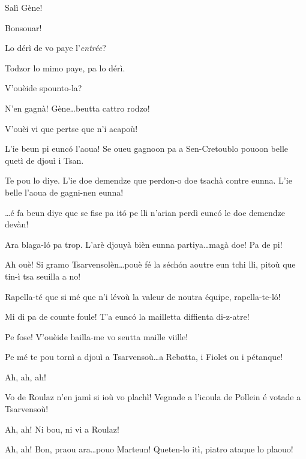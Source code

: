\begin{drama}
\Djouiyaoueunspeaks Salì Gène!

\Genespeaks Bonsouar!

\Dorinaspeaks{} Lo dérì de vo paye l'\textit{entrée}?

\Djouiyaoudouspeaks Todzor lo mimo paye, pa lo dérì.


\Genespeaks{} V'ouèide spounto-la?

\Djouiyaoueunspeaks N'en gagnà! Gène\ldots beutta cattro rodzo!

\Djouiyaoueunspeaks{} V'ouèi vi que pertse que n’i acapoù!

\Djouiyaoudouspeaks L'ie beun pi eunc\'o l'aoua! Se oueu gagnoon pa a Sen-Cretoublo pouoon belle quetì de djouì i Tsan.


\Selmospeaks	Te pou lo diye. L'ie doe demendze que perdon-o doe tsachà contre eunna. L'ie belle l'aoua de gagni-nen eunna!

\Djouiyaoueunspeaks{} \ldots é fa beun diye que se fise pa it\'o pe lli n'arian perdì eunc\'o le doe demendze devàn!

\Djouiyaoudouspeaks Ara blaga-l\'o pa trop. L’arè djouyà bièn eunna partiya\ldots magà doe! Pa de pi!

\Selmospeaks Ah ouè! Si gramo Tsarvensolèn\ldots pouè fé la séch\'on aoutre eun tchi lli, pitoù que tin-ì tsa seuilla a no!

\Marteunspeaks  Rapella-té que si mé que n’i lévoù la valeur de noutra équipe, rapella-te-l\'o!

\Selmospeaks Mi di pa de counte foule! T'a eunc\'o la mailletta diffienta di-z-atre!

\Marteunspeaks Pe fose! V'ouèide bailla-me vo seutta maille viille!

\Djouiyaoudouspeaks{} Pe mé te pou tornì a djouì a Tsarvensoù\ldots a Rebatta, i Fiolet ou i pétanque!

\Selmospeaks Ah, ah, ah!

\Djouiyaoueunspeaks Vo de Roulaz n'en jamì si ioù vo plachì! Vegnade a l'icoula de Pollein é votade a Tsarvensoù!

\Djouiyaoudouspeaks Ah, ah! Ni bou, ni vi a Roulaz!

\Selmospeaks Ah, ah! Bon, praou ara\ldots pouo Marteun! Queten-lo itì, piatro ataque lo plaouo!


\end{drama}
